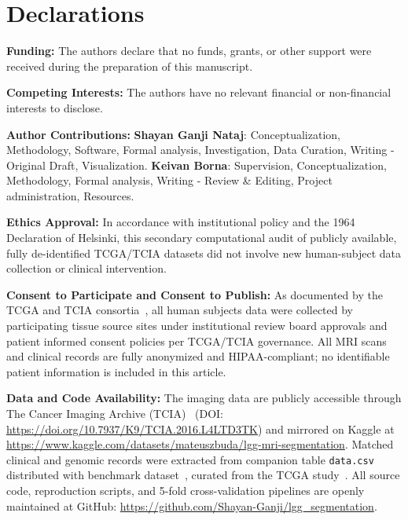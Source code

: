 \documentclass[11pt,a4paper]{article}
\begin{document}
\section*{Declarations}
\begingroup
\fontsize{7.5pt}{8.8pt}\selectfont
\noindent\textbf{Funding:} The authors declare that no funds, grants, or other support were received during the preparation of this manuscript.\par\vspace{0.01em}
\noindent\textbf{Competing Interests:} The authors have no relevant financial or non-financial interests to disclose.\par\vspace{0.01em}
\noindent\textbf{Author Contributions:} \textbf{Shayan Ganji Nataj}: Conceptualization, Methodology, Software, Formal analysis, Investigation, Data Curation, Writing - Original Draft, Visualization. \textbf{Keivan Borna}: Supervision, Conceptualization, Methodology, Formal analysis, Writing - Review \& Editing, Project administration, Resources.\par\vspace{0.01em}
\noindent\textbf{Ethics Approval:} In accordance with institutional policy and the 1964 Declaration of Helsinki, this secondary computational audit of publicly available, fully de-identified TCGA/TCIA datasets did not involve new human-subject data collection or clinical intervention.\par\vspace{0.01em}
\noindent\textbf{Consent to Participate and Consent to Publish:} As documented by the TCGA and TCIA consortia~\cite{clark2013cancer,pedano2016cancer}, all human subjects data were collected by participating tissue source sites under institutional review board approvals and patient informed consent policies per TCGA/TCIA governance. All MRI scans and clinical records are fully anonymized and HIPAA-compliant; no identifiable patient information is included in this article.\par\vspace{0.01em}
\noindent\textbf{Data and Code Availability:} The imaging data are publicly accessible through The Cancer Imaging Archive (TCIA)~\cite{clark2013cancer,pedano2016cancer} (DOI: \url{https://doi.org/10.7937/K9/TCIA.2016.L4LTD3TK}) and mirrored on Kaggle at \url{https://www.kaggle.com/datasets/mateuszbuda/lgg-mri-segmentation}. Matched clinical and genomic records were extracted from companion table \texttt{data.csv} distributed with benchmark dataset~\cite{buda2019association,pedano2016cancer}, curated from the TCGA study~\cite{ceccarelli2016molecular}. All source code, reproduction scripts, and 5-fold cross-validation pipelines are openly maintained at GitHub: \url{https://github.com/Shayan-Ganji/lgg_segmentation}.\par\vspace{0.01em}
\endgroup

\begingroup
\scriptsize
\setlength{\bibsep}{-1.8pt}


\clearpage

\endgroup
\end{document}
